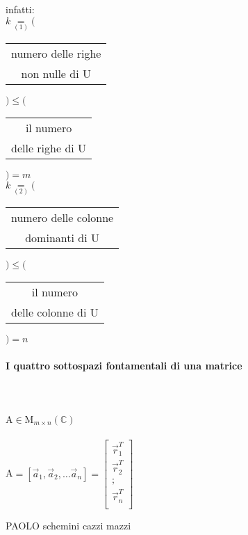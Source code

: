 \begin{enumerate}
        infatti: \\$k\underset{(1)}{=}
        \Bigg($
        \begin{tabular}{c}
            numero delle righe\\
            non nulle di U
        \end{tabular}
        $\Bigg)\leq\Bigg($
        \begin{tabular}{c}
            il numero \\
            delle righe di U
        \end{tabular}
        $\Bigg)=m$\\
        $k\underset{(2)}{=}
        \Bigg($
        \begin{tabular}{c}
            numero delle colonne\\
            dominanti di U
        \end{tabular}
        $\Bigg)\leq\Bigg($
        \begin{tabular}{c}
            il numero \\
            delle colonne di U
        \end{tabular}
        $\Bigg)=n$
\end{enumerate}

\paragraph{I quattro sottospazi fontamentali di una matrice}\hspace{1cm}\\\\
A$\in$M$_{m\times n}(\mathbb{C})$\\\\
A$=[\vec{a}_1,\vec{a}_2,\dots\vec{a}_n]= 
\begin{bmatrix}
    \vec{r}^T_1\\
    \vec{r}^T_2\\
    ;\\
    \vec{r}^T_n\\
\end{bmatrix}
$

{\color{purple}PAOLO schemini cazzi mazzi\\\\}

